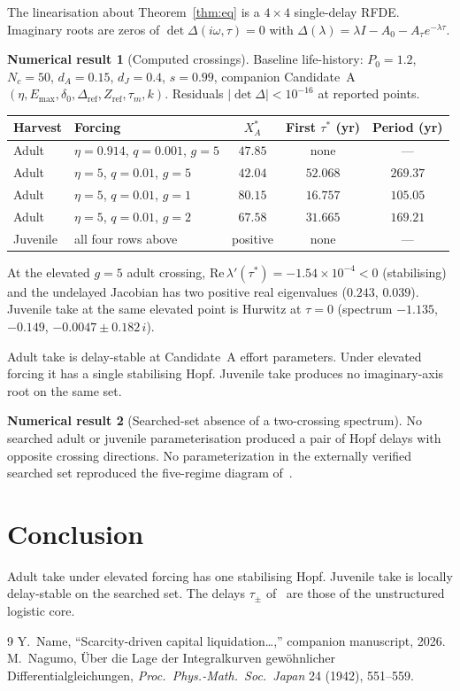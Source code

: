 \documentclass[11pt]{article}
\theoremstyle{definition}
\newtheorem{numresult}{Numerical result}
\begin{document}
The linearisation about Theorem~\ref{thm:eq} is a $4\times 4$ single-delay RFDE. Imaginary roots are zeros of $\det\Delta(i\omega,\tau)=0$ with $\Delta(\lambda)=\lambda I-A_0-A_\tau e^{-\lambda\tau}$.

\begin{numresult}[Computed crossings]
\label{num:hopf}
Baseline life-history: $P_0=1.2$, $N_c=50$, $d_A=0.15$, $d_J=0.4$, $s=0.99$, companion Candidate~A $(\eta,E_{\max},\delta_0,\Delta_{\mathrm{ref}},Z_{\mathrm{ref}},\tau_m,k)$. Residuals $|\det\Delta|<10^{-16}$ at reported points.
\begin{center}
\begin{tabular}{llccc}
\toprule
Harvest & Forcing & $X_A^*$ & First $\tau^*$ (yr) & Period (yr) \\
\midrule
Adult & $\eta=0.914$, $q=0.001$, $g=5$ & $47.85$ & none & --- \\
Adult & $\eta=5$, $q=0.01$, $g=5$ & $42.04$ & $52.068$ & $269.37$ \\
Adult & $\eta=5$, $q=0.01$, $g=1$ & $80.15$ & $16.757$ & $105.05$ \\
Adult & $\eta=5$, $q=0.01$, $g=2$ & $67.58$ & $31.665$ & $169.21$ \\
Juvenile & all four rows above & positive & none & --- \\
\bottomrule
\end{tabular}
\end{center}
At the elevated $g=5$ adult crossing, $\mathrm{Re}\,\lambda'(\tau^*)=-1.54\times 10^{-4}<0$ (stabilising) and the undelayed Jacobian has two positive real eigenvalues ($0.243$, $0.039$). Juvenile take at the same elevated point is Hurwitz at $\tau=0$ (spectrum $-1.135$, $-0.149$, $-0.0047\pm 0.182\,i$).
\end{numresult}

Adult take is delay-stable at Candidate~A effort parameters. Under elevated forcing it has a single stabilising Hopf. Juvenile take produces no imaginary-axis root on the same set.

\begin{numresult}[Searched-set absence of a two-crossing spectrum]
\label{prop:not}
No searched adult or juvenile parameterisation produced a pair of Hopf delays with opposite crossing directions. No parameterization in the externally verified searched set reproduced the five-regime diagram of~\cite{paperI}.
\end{numresult}

\section{Conclusion}

Adult take under elevated forcing has one stabilising Hopf. Juvenile take is locally delay-stable on the searched set. The delays $\tau_\pm$ of~\cite{paperI} are those of the unstructured logistic core.

\begin{thebibliography}{9}
 Y.\ Name, ``Scarcity-driven capital liquidation\ldots,'' companion manuscript, 2026.
 M.\ Nagumo, \"Uber die Lage der Integralkurven gew\"ohnlicher Differentialgleichungen, \emph{Proc.\ Phys.-Math.\ Soc.\ Japan} 24 (1942), 551--559.
\end{thebibliography}
\end{document}
